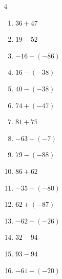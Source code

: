 \begin{multicols}{4}
\begin{enumerate}
  \item $36+47$

        \phantom{$=83$}

  \item $19-52$

        \phantom{$=-33$}

  \item $-16-(-86)$

        \phantom{$=70$}

  \item $16-(-38)$

        \phantom{$=54$}

  \item $40-(-38)$

        \phantom{$=78$}

  \item $74+(-47)$

        \phantom{$=27$}

  \item $81+75$

        \phantom{$=156$}

  \item $-63-(-7)$

        \phantom{$=-56$}

  \item $79-(-88)$

        \phantom{$=167$}

  \item $86+62$

        \phantom{$=148$}

  \item $-35-(-80)$

        \phantom{$=45$}

  \item $62+(-87)$

        \phantom{$=-25$}

  \item $-62-(-26)$

        \phantom{$=-36$}

  \item $32-94$

        \phantom{$=-62$}

  \item $93-94$

        \phantom{$=-1$}

  \item $-61-(-20)$

        \phantom{$=-41$}


\end{enumerate}
\end{multicols}
